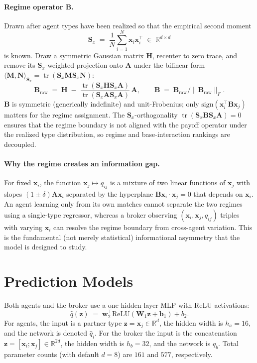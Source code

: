 \documentclass[11pt]{article}
\newcommand{\x}{\mathbf{x}}
\newcommand{\A}{\mathbf{A}}
\newcommand{\B}{\mathbf{B}}
\newcommand{\Sx}{\mathbf{S}_x}
\newcommand{\qhat}{\hat{q}}
\newcommand{\R}{\mathbb{R}}
\newcommand{\Ntot}{N}
\DeclareMathOperator{\tr}{tr}
\begin{document}
\paragraph{Regime operator $\B$.} Drawn after agent types have been realized so that the empirical second moment
\begin{equation}
\Sx \;=\; \frac{1}{\Ntot}\sum_{i=1}^{\Ntot}\x_i\x_i^\top \;\in\;\R^{d\times d}
\label{eq:Sx}
\end{equation}
is known. Draw a symmetric Gaussian matrix $\mathbf{H}$, recenter to zero trace, and remove its $\Sx$-weighted projection onto $\A$ under the bilinear form $\langle \mathbf{M},\mathbf{N}\rangle_{\Sx} = \tr(\Sx\mathbf{M}\Sx\mathbf{N})$:
\begin{equation}
\B_{\text{raw}} \;=\; \mathbf{H} \;-\; \frac{\tr(\Sx\mathbf{H}\Sx\A)}{\tr(\Sx\A\Sx\A)}\,\A,\qquad
\B \;=\; \B_{\text{raw}}\big/\|\B_{\text{raw}}\|_F.
\label{eq:B}
\end{equation}
$\B$ is symmetric (generically indefinite) and unit-Frobenius; only $\mathrm{sign}(\x_i^\top \B\x_j)$ matters for the regime assignment. The $\Sx$-orthogonality $\tr(\Sx\B\Sx\A)=0$ ensures that the regime boundary is not aligned with the payoff operator under the realized type distribution, so regime and base-interaction rankings are decoupled.

\paragraph{Why the regime creates an information gap.} For fixed $\x_i$, the function $\x_j\mapsto q_{ij}$ is a mixture of two linear functions of $\x_j$ with slopes $(1\pm\delta)\A\x_i$ separated by the hyperplane $\B\x_i\cdot\x_j = 0$ that depends on $\x_i$. An agent learning only from its own matches cannot separate the two regimes using a single-type regressor, whereas a broker observing $(\x_i,\x_j,q_{ij})$ triples with varying $\x_i$ can resolve the regime boundary from cross-agent variation. This is the fundamental (not merely statistical) informational asymmetry that the model is designed to study.

\section{Prediction Models}\label{sec:nn}

Both agents and the broker use a one-hidden-layer MLP with ReLU activations:
\begin{equation}
\qhat(\mathbf{z}) \;=\; \mathbf{w}_2^\top\mathrm{ReLU}(\mathbf{W}_1\mathbf{z} + \mathbf{b}_1) + b_2.
\label{eq:nn}
\end{equation}
For agents, the input is a partner type $\mathbf{z}=\x_j\in\R^{d}$, the hidden width is $h_a=16$, and the network is denoted $\qhat_i$. For the broker the input is the concatenation $\mathbf{z}=[\x_i;\x_j]\in\R^{2d}$, the hidden width is $h_b=32$, and the network is $\qhat_b$. Total parameter counts (with default $d=8$) are $161$ and $577$, respectively.
\end{document}

